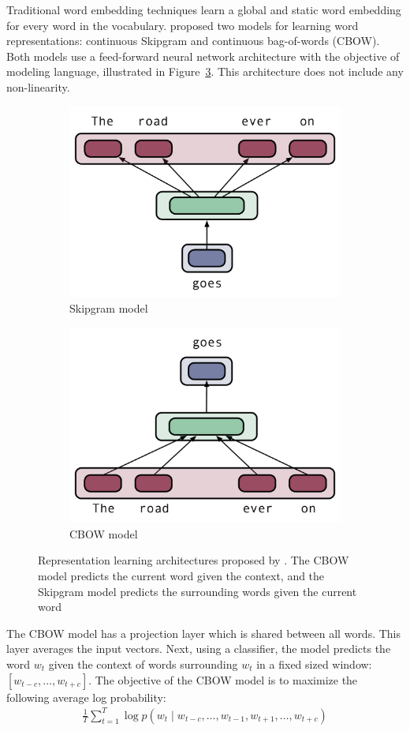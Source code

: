 Traditional word embedding techniques learn a global and static word embedding for every word in the vocabulary. 
\citet{mikolov2013efficient} proposed two models for learning word representations: continuous Skipgram and continuous bag-of-words (CBOW).
Both models use a feed-forward neural network architecture with the objective of modeling language, illustrated in Figure~\ref{bgsgcbowfig}.
This architecture does not include any non-linearity. 
\begin{figure}
\centering
\begin{subfigure}[t]{.45\textwidth}
  \centering
\includegraphics[width=0.8\linewidth]{02-background/figs/skipgram.pdf}
\caption{Skipgram model}
\label{bgsgfig}
\end{subfigure}%
\begin{subfigure}[t]{.45\textwidth}
  \centering
\includegraphics[width=.8\linewidth]{02-background/figs/cbow.pdf}
  \caption{CBOW model}
  \label{bgcbowfig}
\end{subfigure}
\caption{Representation learning architectures proposed by \citet{mikolov2013efficient}. The CBOW model predicts the current word given the context, and the Skipgram model predicts the surrounding words given the current word}
\label{bgsgcbowfig}
\end{figure}
The CBOW model has a projection layer which is shared between all words. This layer averages the input vectors.
Next, using a classifier, the model predicts the word $w_t$ given the context of words surrounding $w_t$ in a fixed sized window: $[w_{t-c}, \ldots, w_{t+c}]$. The objective of the CBOW model is to maximize the following average log probability:
\begin{align}
\frac{1}{T} \sum_{t=1}^T \log p(w_{t} \mid w_{t-c}, \ldots, w_{t-1}, w_{t+1}, \ldots, w_{t+c})
\end{align}

